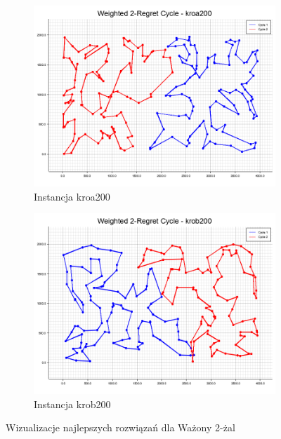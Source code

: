 \documentclass[12pt,a4paper]{article}
\begin{document}
\begin{figure}[H]
\begin{adjustwidth}{-1.5cm}{-1.5cm}
    \centering
    \begin{subfigure}[b]{0.6\textwidth}
        \centering
        \includegraphics[width=\textwidth]{figures/kroa200_Weighted_2-Regret_Cycle.png}
        \caption{Instancja kroa200}
        \label{fig:weighted_regret_kroa200}
    \end{subfigure}
    \hfill
    \begin{subfigure}[b]{0.6\textwidth}
        \centering
        \includegraphics[width=\textwidth]{figures/krob200_Weighted_2-Regret_Cycle.png}
        \caption{Instancja krob200}
        \label{fig:weighted_regret_krob200}
    \end{subfigure}
    \caption{Wizualizacje najlepszych rozwiązań dla Ważony 2-żal}
    \label{fig:weighted_regret}
\end{adjustwidth}
\end{figure}
\end{document}
